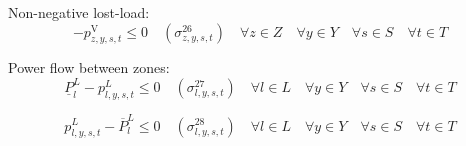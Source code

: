 \documentclass{article}
\newcommand{\sStorage}{G^{\mathrm{Q}}}
\newcommand{\sYears}{Y}
\newcommand{\sScenarios}{S}
\newcommand{\sIntervals}{T}
\newcommand{\sZones}{Z}
\newcommand{\sLinks}{L}
\newcommand{\iGenerator}{g}
\newcommand{\iYear}{y}
\newcommand{\iScenario}{s}
\newcommand{\iInterval}{t}
\newcommand{\iIntervalStart}{\underline{\iInterval}}
\newcommand{\iZone}{z}
\newcommand{\iLink}{l}
\newcommand{\cRampRateDown}[1][\iGenerator]{RD_{#1}}
\newcommand{\cPowerFlowMin}{\underline{P}_{\iLink}^{L}}
\newcommand{\cPowerFlowMax}{\overline{P}_{\iLink}^{L}}
\newcommand{\cPowerOutInitial}[1][\iGenerator,\iYear,\iScenario]{\hat{P}_{#1}^{\mathrm{out}}}
\newcommand{\cPowerInInitial}[1][\iGenerator,\iYear,\iScenario]{\hat{P}_{#1}^{\mathrm{in}}}
\newcommand{\vPowerIn}[1][\iGenerator,\iYear,\iScenario,\iInterval]{p^{\mathrm{in}}_{#1}}
\newcommand{\vPowerOut}[1][\iGenerator,\iYear,\iScenario,\iInterval]{p^{\mathrm{out}}_{#1}}
\newcommand{\vPowerFlow}[1][\iLink,\iYear,\iScenario,\iInterval]{p^{\sLinks}_{#1}}
\newcommand{\vLostLoadPower}[1][\iZone,\iYear,\iScenario,\iInterval]{p^{\mathrm{V}}_{#1}}
\newcommand{\dRampRateDownStorageCharging}[1][\iGenerator,\iYear,\iScenario,\iInterval]{\sigma_{#1}^{24}}
\newcommand{\dRampRateDownStorageDischarging}[1][\iGenerator,\iYear,\iScenario,\iInterval]{\sigma_{#1}^{25}}
\newcommand{\dNonNegativeLostLoad}[1][\iZone,\iYear,\iScenario,\iInterval]{\sigma_{#1}^{26}}
\newcommand{\dMinPowerFlow}[1][\iLink,\iYear,\iScenario,\iInterval]{\sigma_{#1}^{27}}
\newcommand{\dMaxPowerFlow}[1][\iLink,\iYear,\iScenario,\iInterval]{\sigma_{#1}^{28}}
\newcommand{\sScenarioSets}{\quad \forall \iYear \in \sYears \quad \forall \iScenario \in \sScenarios \quad \forall \iInterval \in \sIntervals}
\begin{document}
%
%
%

Non-negative lost-load:
\begin{equation}
	- \vLostLoadPower \leq 0 \quad (\dNonNegativeLostLoad) \quad \forall \iZone \in \sZones \sScenarioSets
\end{equation}

Power flow between zones:
\begin{equation}
	\cPowerFlowMin - \vPowerFlow \leq 0 \quad (\dMinPowerFlow) \quad \forall \iLink \in \sLinks \sScenarioSets
\end{equation}

\begin{equation}
	\vPowerFlow - \cPowerFlowMax \leq 0 \quad (\dMaxPowerFlow) \quad \forall \iLink \in \sLinks \sScenarioSets
\end{equation}
\end{document}
